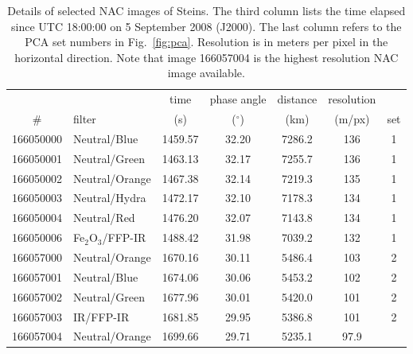 \documentclass[preprint,3p,authoryear]{elsarticle}
\begin{document}
\begin{table}
\centering
\caption{Details of selected NAC images of Steins. The third column lists the time elapsed since UTC 18:00:00 on 5 September 2008 (J2000). The last column refers to the PCA set numbers in Fig.~\ref{fig:pca}. Resolution is in meters per pixel in the horizontal direction. Note that image 166057004 is the highest resolution NAC image available.}
\vspace{5mm}
\begin{tabular}{|clccccc|}
\hline
\hline
   &        & time & phase angle & distance & resolution & \\
\# & filter & (s)  & ($^\circ$)  & (km)     & (m/px)     & set \\
\hline
166050000 & Neutral/Blue       & 1459.57 & 32.20 & 7286.2 & 136  & 1 \\
166050001 & Neutral/Green      & 1463.13 & 32.17 & 7255.7 & 136  & 1 \\
166050002 & Neutral/Orange     & 1467.38 & 32.14 & 7219.3 & 135  & 1 \\
166050003 & Neutral/Hydra      & 1472.17 & 32.10 & 7178.3 & 134  & 1 \\
166050004 & Neutral/Red        & 1476.20 & 32.07 & 7143.8 & 134  & 1 \\
166050006 & Fe$_2$O$_3$/FFP-IR & 1488.42 & 31.98 & 7039.2 & 132  & 1 \\
166057000 & Neutral/Orange     & 1670.16 & 30.11 & 5486.4 & 103  & 2 \\
166057001 & Neutral/Blue       & 1674.06 & 30.06 & 5453.2 & 102  & 2 \\
166057002 & Neutral/Green      & 1677.96 & 30.01 & 5420.0 & 101  & 2 \\
166057003 & IR/FFP-IR          & 1681.85 & 29.95 & 5386.8 & 101  & 2 \\
166057004 & Neutral/Orange     & 1699.66 & 29.71 & 5235.1 & 97.9 &   \\
\hline
\hline
\end{tabular}
\label{tab:nac_images}
\end{table}
\end{document}
